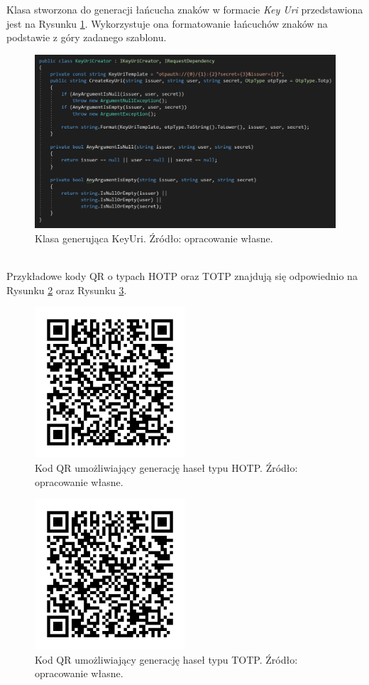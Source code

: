 Klasa stworzona do generacji łańcucha znaków w formacie \textit{Key Uri} przedstawiona jest na Rysunku \ref{code-keyuri}.
Wykorzystuje ona formatowanie łańcuchów znaków na podstawie z góry zadanego szablonu.
\begin{figure}[t]
    \centering
	\includegraphics[width=\textwidth]{content/images/code-keyuri}
    \caption{Klasa generująca KeyUri. Źródło: opracowanie własne.}
    \label{code-keyuri}
\end{figure} \\
Przykładowe kody QR o typach HOTP oraz TOTP znajdują się odpowiednio na Rysunku \ref{qr-hotp} oraz Rysunku \ref{qr-totp}.
\begin{figure}[t]
    \centering
	\includegraphics[width=0.5\textwidth]{content/images/qr-hotp}
    \caption{Kod QR umożliwiający generację haseł typu HOTP. Źródło: opracowanie własne.}
    \label{qr-hotp}
\end{figure}
\begin{figure}[t]
    \centering
	\includegraphics[width=0.5\textwidth]{content/images/qr-totp}
	\caption{Kod QR umożliwiający generację haseł typu TOTP. Źródło: opracowanie własne.}
    \label{qr-totp}
\end{figure}
